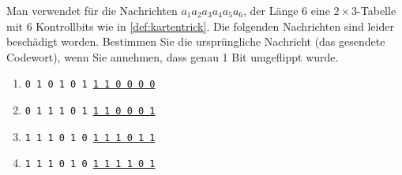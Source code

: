 \begin{myexercise}
    Man verwendet für die Nachrichten $a_1a_2a_3a_4a_5a_6$, der Länge 6 eine $2 \times 3$-Tabelle mit 6 Kontrollbits wie in \cref{def:kartentrick}. Die folgenden Nachrichten sind leider beschädigt worden. Bestimmen Sie die ursprüngliche Nachricht (das gesendete Codewort), wenn Sie annehmen, dass genau 1 Bit umgeflippt wurde.

    \begin{enumerate}
        \item \texttt{0 1 0 1 0 1 \underline{1 1 0 0 0 0}}
        \item \texttt{0 1 1 1 0 1 \underline{1 1 0 0 0 1}}
        \item \texttt{1 1 1 0 1 0 \underline{1 1 1 0 1 1}}
        \item \texttt{1 1 1 0 1 0 \underline{1 1 1 1 0 1}}
    \end{enumerate}
\end{myexercise}
